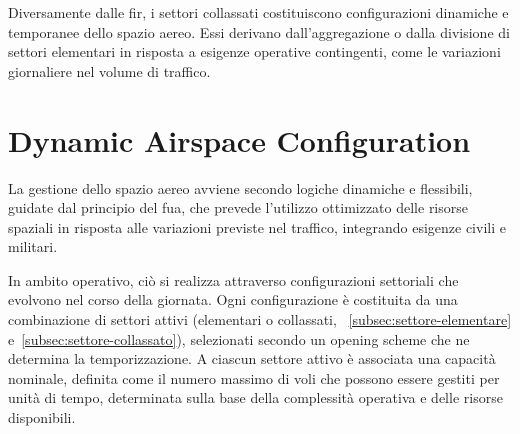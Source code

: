 Diversamente dalle \acrshort{fir}, i settori collassati costituiscono configurazioni dinamiche e temporanee dello spazio aereo. Essi derivano dall'aggregazione o dalla divisione di settori elementari in risposta a esigenze operative contingenti, come le variazioni giornaliere nel volume di traffico.

\section{Dynamic Airspace Configuration}
La gestione dello spazio aereo avviene secondo logiche dinamiche e flessibili, guidate dal principio del \acrfull{fua}, che prevede l’utilizzo ottimizzato delle risorse spaziali in risposta alle variazioni previste nel traffico, integrando esigenze civili e militari.

In ambito operativo, ciò si realizza attraverso configurazioni settoriali che evolvono nel corso della giornata. Ogni configurazione è costituita da una combinazione di settori attivi (elementari o collassati, \textsection\textsection~\ref{subsec:settore-elementare} e~\ref{subsec:settore-collassato}), selezionati secondo un opening scheme che ne determina la temporizzazione. A ciascun settore attivo è associata una capacità nominale, definita come il numero massimo di voli che possono essere gestiti per unità di tempo, determinata sulla base della complessità operativa e delle risorse disponibili.

